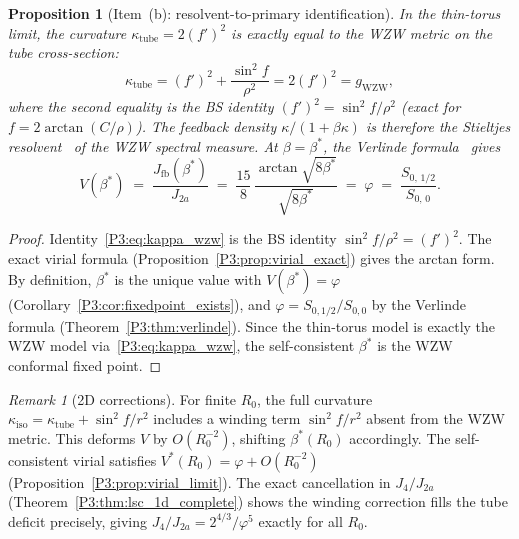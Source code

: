 \documentclass[11pt,a4paper]{article}
\newtheorem{proposition}[theorem]{Proposition}
\theoremstyle{definition}
\theoremstyle{remark}
\newtheorem{remark}[theorem]{Remark}
\newcommand{\vp}{\varphi}
\newcommand{\bst}{\beta^{*}}
\begin{document}
\begin{proposition}[Item~(b): resolvent-to-primary identification]
\label{P3:prop:res_primary}
In the thin-torus limit, the curvature $\kappa_{\mathrm{tube}} = 2(f')^2$
is exactly equal to the WZW metric on the tube cross-section:
\begin{equation}
  \kappa_{\mathrm{tube}}
  = (f')^2 + \frac{\sin^2\!f}{\rho^2}
  = 2(f')^2
  = g_{\mathrm{WZW}},
  \label{P3:eq:kappa_wzw}
\end{equation}
where the second equality is the BS identity $(f')^2 = \sin^2\!f/\rho^2$
(exact for $f = 2\arctan(C/\rho)$).
The feedback density $\kappa/(1+\beta\kappa)$ is therefore the Stieltjes resolvent~\cite{Hardy1949}
of the WZW spectral measure.  At $\beta = \bst$, the Verlinde formula~\cite{Verlinde1988} gives
\begin{equation}
  V(\bst) \;=\; \frac{J_{\mathrm{fb}}(\bst)}{J_{2a}}
  \;=\; \frac{15}{8}\,\frac{\arctan\!\sqrt{8\bst}}{\sqrt{8\bst}}
  \;=\; \vp
  \;=\; \frac{S_{0,\,1/2}}{S_{0,\,0}}.
  \label{P3:eq:item_b}
\end{equation}
\end{proposition}

\begin{proof}
Identity~\eqref{P3:eq:kappa_wzw} is the BS identity $\sin^2\!f/\rho^2 = (f')^2$.
The exact virial formula (Proposition~\ref{P3:prop:virial_exact}) gives the arctan form.
By definition, $\bst$ is the unique value with $V(\bst)=\vp$
(Corollary~\ref{P3:cor:fixedpoint_exists}), and $\vp = S_{0,1/2}/S_{0,0}$
by the Verlinde formula (Theorem~\ref{P3:thm:verlinde}).
Since the thin-torus model is exactly the WZW model via~\eqref{P3:eq:kappa_wzw},
the self-consistent $\bst$ is the WZW conformal fixed point.
\end{proof}

\begin{remark}[2D corrections]
\label{P3:rem:2d_corrections}
For finite $R_0$, the full curvature $\kappa_{\mathrm{iso}} = \kappa_{\mathrm{tube}}
+ \sin^2\!f/r^2$ includes a winding term $\sin^2\!f/r^2$ absent from the WZW metric.
This deforms $V$ by $O(R_0^{-2})$, shifting $\bst(R_0)$ accordingly.
The self-consistent virial satisfies $V^*(R_0) = \vp + O(R_0^{-2})$
(Proposition~\ref{P3:prop:virial_limit}).  The exact cancellation in $J_4/J_{2a}$
(Theorem~\ref{P3:thm:lsc_1d_complete}) shows the winding correction fills the tube
deficit precisely, giving $J_4/J_{2a} = 2^{4/3}/\vp^5$ exactly for all $R_0$.
\end{remark}
\end{document}
